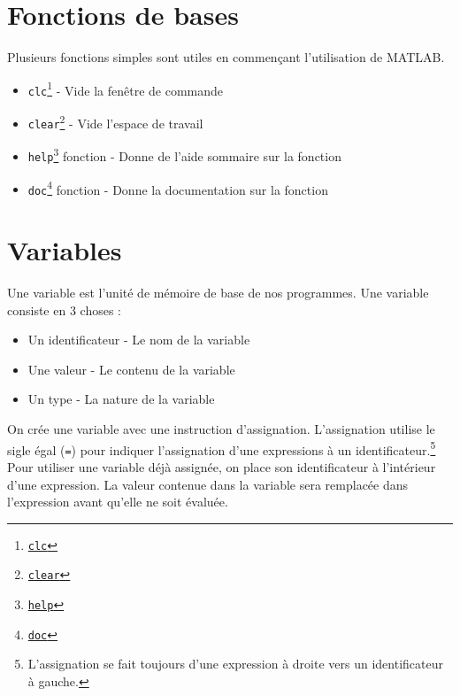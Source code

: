 \documentclass[]{tufte-handout}
\providecommand{\tightlist}{%
  \setlength{\itemsep}{0pt}\setlength{\parskip}{0pt}}
\begin{document}
\hypertarget{fonctions-de-bases}{%
\section{Fonctions de bases}\label{fonctions-de-bases}}

Plusieurs fonctions simples sont utiles en commençant l'utilisation de
MATLAB.

\begin{itemize}
\tightlist
\item
  \texttt{clc}\footnote{\href{https://www.mathworks.com/help/matlab/ref/clc.html}{\texttt{clc}}}
  - Vide la fenêtre de commande
\item
  \texttt{clear}\footnote{\href{https://www.mathworks.com/help/matlab/ref/clear.html}{\texttt{clear}}}
  - Vide l'espace de travail
\item
  \texttt{help}\footnote{\href{https://www.mathworks.com/help/matlab/ref/help.html}{\texttt{help}}}
  fonction - Donne de l'aide sommaire sur la fonction
\item
  \texttt{doc}\footnote{\href{https://www.mathworks.com/help/matlab/ref/doc.html}{\texttt{doc}}}
  fonction - Donne la documentation sur la fonction
\end{itemize}

\hypertarget{variables}{%
\section{Variables}\label{variables}}

Une variable est l'unité de mémoire de base de nos programmes. Une
variable consiste en 3 choses :

\begin{itemize}
\tightlist
\item
  Un identificateur - Le nom de la variable
\item
  Une valeur - Le contenu de la variable
\item
  Un type - La nature de la variable
\end{itemize}

On crée une variable avec une instruction d'assignation. L'assignation
utilise le sigle égal (\texttt{=}) pour indiquer l'assignation d'une
expressions à un identificateur.\footnote{L'assignation se fait toujours
  d'une expression à droite vers un identificateur à gauche.} Pour
utiliser une variable déjà assignée, on place son identificateur à
l'intérieur d'une expression. La valeur contenue dans la variable sera
remplacée dans l'expression avant qu'elle ne soit évaluée.
\end{document}
